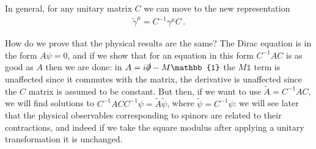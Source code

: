 \documentclass[main.tex]{subfiles}
\begin{document}
In general, for any unitary matrix \(C\) we can move to the new representation 
%
\begin{align}
\widetilde{\gamma}^{\mu } =C^{-1} \gamma^{\mu } C
\,.
\end{align}

How do we prove that the physical results are the same?
The Dirac equation is in the form \(A \psi =0\), and if we show that for an equation in this form \(C^{-1} A C\) is as good as \(A\) then we are done: in \(A = i \slashed{\partial} - M \mathbb{1}\) the \(M \mathbb{1}\) term is unaffected since it commutes with the matrix, the derivative is unaffected since the \(C\) matrix is assumed to be constant.
But then, if we want to use \( \widetilde{A} = C^{-1}A C\), we will find solutions to \(C^{-1} A C C^{-1} \psi = \widetilde{A} \widetilde{\psi}\), where \(\widetilde{\psi} = C^{-1} \psi \): we will see later that the physical observables corresponding to spinors are related to their contractions, and indeed if we take the square modulus after applying a unitary transformation it is unchanged. 
\end{document}
